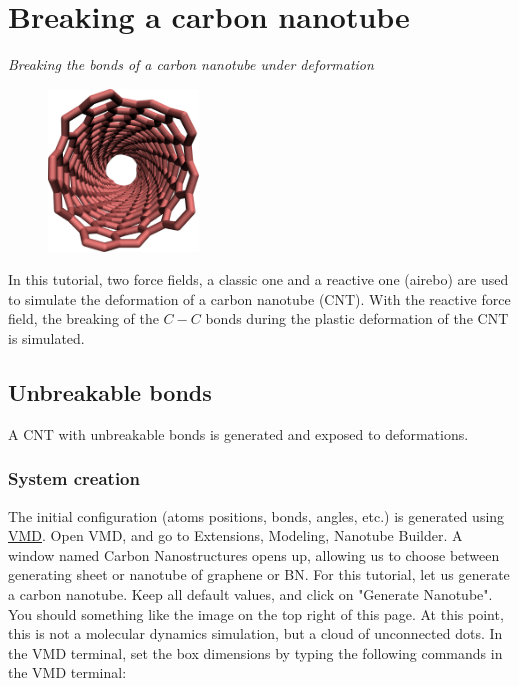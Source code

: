 \chapter{Breaking a carbon nanotube}

\vspace{-1cm} \noindent \textcolor{graytitle}{\textit{{\Large Breaking the bonds of a carbon nanotube under deformation}}\vspace{0.5cm} }

\noindent \hspace{-0.45cm}\begin{figure}
\includegraphics[width=4cm]{tutorials/level1/breaking-a-carbon-nanotube/CNT_light.png}
\end{figure}

\noindent In this tutorial, two force fields, a classic one and a reactive one (airebo) 
are used to simulate the deformation of a carbon nanotube (CNT). With the reactive 
force field, the breaking of the $C-C$ bonds during the plastic deformation of the CNT is 
simulated.

\section{Unbreakable bonds}

\noindent A CNT with unbreakable bonds is generated and exposed to deformations.

\subsection{System creation}

\noindent The initial configuration (atoms positions, bonds, angles,
etc.) is generated using \href{https://www.ks.uiuc.edu/Research/vmd/}{VMD}. Open VMD,
and go to Extensions, Modeling, Nanotube Builder. A window
named Carbon Nanostructures opens up, allowing us to choose
between generating sheet or nanotube of graphene or BN. For
this tutorial, let us generate a carbon nanotube.
Keep all default values, and click on "Generate
Nanotube". You should something like the image on the top right 
of this page.
At this point, this is not a molecular dynamics simulation,
but a cloud of unconnected dots. In the VMD terminal, set the
box dimensions by typing the following commands in the VMD terminal:

